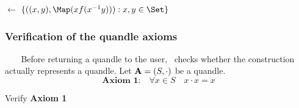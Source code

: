 \documentclass{mcom-l}
\begin{document}
\begin{example}
\begin{algorithm}[H]
\Graph $\leftarrow$ $\{((x,y), \Map(xf(x^{-1}y))) : x,y \in \Set\}$\;
\end{algorithm}

\end{example}


\subsubsection{Verification of the quandle axioms}\textcolor{white}{line}\newline
Before returning a quandle to the user, \Software~checks whether the construction actually represents a quandle.\newline
Let $\mathbf{A} = (S, \cdot)$ be a quandle. 
\[\textbf{Axiom 1:}\quad\forall x \in S \quad x\cdot x = x\]
\begin{algorithm}[H]
\DontPrintSemicolon
\caption{Verify \textbf{Axiom 1}}\label{alg:axiom1}
\BlankLine
\BlankLine
{}
\end{algorithm}
\end{document}
